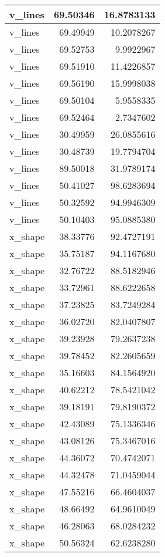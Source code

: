 \documentclass[
]{book}
\theoremstyle{definition}
\theoremstyle{definition}
\theoremstyle{definition}
\theoremstyle{definition}
\theoremstyle{remark}
\begin{document}
\begin{tabular}{l|r|r}
\hline
v\_lines & 69.50346 & 16.8783133\\
\hline
v\_lines & 69.49949 & 10.2078267\\
\hline
v\_lines & 69.52753 & 9.9922967\\
\hline
v\_lines & 69.51910 & 11.4226857\\
\hline
v\_lines & 69.56190 & 15.9998038\\
\hline
v\_lines & 69.50104 & 5.9558335\\
\hline
v\_lines & 69.52464 & 2.7347602\\
\hline
v\_lines & 30.49959 & 26.0855616\\
\hline
v\_lines & 30.48739 & 19.7794704\\
\hline
v\_lines & 89.50018 & 31.9789174\\
\hline
v\_lines & 50.41027 & 98.6283694\\
\hline
v\_lines & 50.32592 & 94.9946309\\
\hline
v\_lines & 50.10403 & 95.0885380\\
\hline
x\_shape & 38.33776 & 92.4727191\\
\hline
x\_shape & 35.75187 & 94.1167680\\
\hline
x\_shape & 32.76722 & 88.5182946\\
\hline
x\_shape & 33.72961 & 88.6222658\\
\hline
x\_shape & 37.23825 & 83.7249284\\
\hline
x\_shape & 36.02720 & 82.0407807\\
\hline
x\_shape & 39.23928 & 79.2637238\\
\hline
x\_shape & 39.78452 & 82.2605659\\
\hline
x\_shape & 35.16603 & 84.1564920\\
\hline
x\_shape & 40.62212 & 78.5421042\\
\hline
x\_shape & 39.18191 & 79.8190372\\
\hline
x\_shape & 42.43089 & 75.1336346\\
\hline
x\_shape & 43.08126 & 75.3467016\\
\hline
x\_shape & 44.36072 & 70.4742071\\
\hline
x\_shape & 44.32478 & 71.0459044\\
\hline
x\_shape & 47.55216 & 66.4604037\\
\hline
x\_shape & 48.66492 & 64.9610049\\
\hline
x\_shape & 46.28063 & 68.0284232\\
\hline
x\_shape & 50.56324 & 62.6238280\\

\end{tabular}
\end{document}
